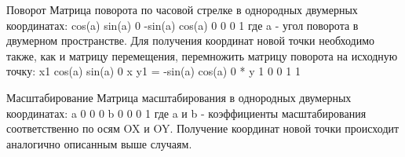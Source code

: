 Поворот
Матрица поворота по часовой стрелке в однородных двумерных координатах:
cos(a)  sin(a) 0
-sin(a) cos(a) 0
0       0      1
где a - угол поворота в двумерном пространстве. Для получения координат новой точки необходимо также, как и матрицу перемещения, перемножить матрицу поворота на исходную точку:
x1     cos(a)  sin(a) 0     x 
y1  =  -sin(a) cos(a) 0  *  y
1      0       0      1     1

Масштабирование
Матрица масштабирования в однородных двумерных координатах:
a 0 0
0 b 0
0 0 1
где a и b - коэффициенты масштабирования соответственно по осям OX и OY. Получение координат новой точки происходит аналогично описанным выше случаям.
